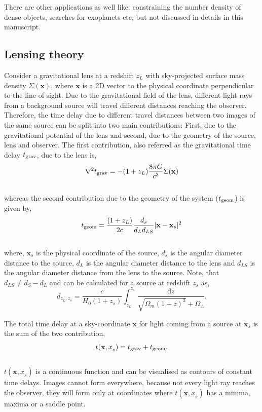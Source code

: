 There are other applications as well like: constraining the number density of dense objects, searches
for exoplanets etc, but not discussed in details in this manuscript. 





\subsection{Lensing theory}

Consider a gravitational lens at a redshift $z_L$ with sky-projected surface
mass density $\Sigma({\mathbf x})$, where ${\mathbf x}$ is a 2D vector to the
physical coordinate perpendicular to the line of sight. Due to the 
gravitational field of the lens, different light rays from a background source
will travel different distances reaching the observer. Therefore, the time delay
due to different travel distances between two images of the same source can be
split into two main contributions: First, due to the gravitational potential 
of the lens and second, due to the geometry of the source, lens and observer. 
The first contribution, also referred as the gravitational time delay $t_{\rm grav}$,
due to the lens is,
\begin{equation}
	\nabla^2t_{\rm grav} = -(1+z_L) \dfrac{8\pi G}{c^3} \Sigma({\mathbf x})
	\label{eqn:tgrav}
\end{equation}
\\
whereas the second contribution due to the geometry of the system ($t_{\rm geom}$) 
is given by,
\begin{equation}
	t_{\rm geom} = \dfrac{(1+z_L)}{2c} \dfrac{d_s}{d_L d_{LS}} |{\mathbf x}-{\mathbf x}_s|^2
\end{equation}
\\
where, ${\mathbf x}_s$ is the physical coordinate of the source, $d_s$ is the
angular diameter distance to the source, $d_L$ is the angular diameter distance
to the lens and $d_{LS}$ is the angular diameter distance from the lens to the
source. Note, that $d_{LS} \neq d_S - d_L$ and can be calculated for a source
at redshift $z_s$ as,
\begin{equation}
	d_{z_L,z_s} = \dfrac{c}{H_0(1+z_s)} \int_{z_L}^{z_s} \dfrac{\mathrm{d}z}
				{\sqrt{\Omega_m(1+z)^3}+\Omega_{\Lambda}}.
\end{equation}

The total time delay at a sky-coordinate ${\mathbf x}$ for light coming from
a source at ${\mathbf x}_s$ is the sum of the two contribution,
\begin{equation}
	t({\mathbf x,x}_s) = t_{\rm grav}  + t_{\rm geom}.
\end{equation}
\\
$t({\mathbf x,x}_s)$ is a continuous function and can be visualised as contours
of constant time delays. Images cannot form everywhere, because not every light
ray reaches the observer, they will form only at coordinates where $t({\mathbf x,x}_s)$
has a minima, maxima or a saddle point. 


